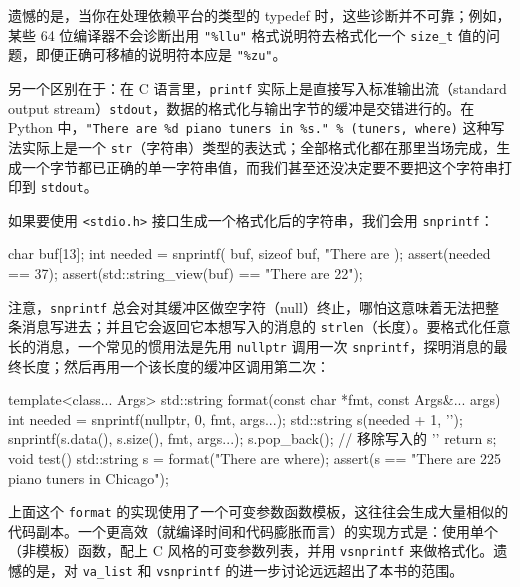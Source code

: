 遗憾的是，当你在处理依赖平台的类型的 typedef 时，这些诊断并不可靠；例如，某些 64 位编译器不会诊断出用 \texttt{"\%llu"} 格式说明符去格式化一个 \texttt{size\_\allowbreak{}t} 值的问题，即便正确可移植的说明符本应是 \texttt{"\%zu"}。

另一个区别在于：在 C 语言里，\texttt{printf} 实际上是直接写入标准输出流（standard output stream）\texttt{stdout}，数据的格式化与输出字节的缓冲是交错进行的。在 Python 中，\texttt{"There are \%d piano tuners in \%s." \% (\allowbreak{}tuners,\allowbreak{} where)\allowbreak{}} 这种写法实际上是一个 \texttt{str}（字符串）类型的表达式；全部格式化都在那里当场完成，生成一个字节都已正确的单一字符串值，而我们甚至还没决定要不要把这个字符串打印到 \texttt{stdout}。

如果要使用 \texttt{<stdio.\allowbreak{}h>\allowbreak{}} 接口生成一个格式化后的字符串，我们会用 \texttt{snprintf}：

\begin{codebox}[cpp]
    char buf[13];
    int needed = snprintf(
      buf, sizeof buf,
      "There are %
    );
    assert(needed == 37);
    assert(std::string_view(buf) == "There are 22");
\end{codebox}

注意，\texttt{snprintf} 总会对其缓冲区做空字符（null）终止，哪怕这意味着无法把整条消息写进去；并且它会返回它本想写入的消息的 \texttt{strlen}（长度）。要格式化任意长的消息，一个常见的惯用法是先用 \texttt{nullptr} 调用一次 \texttt{snprintf}，探明消息的最终长度；然后再用一个该长度的缓冲区调用第二次：

\begin{codebox}[cpp]
    template<class... Args>
    std::string format(const char *fmt, const Args&... args)
    {
      int needed = snprintf(nullptr, 0, fmt, args...);
      std::string s(needed + 1, '\0');
      snprintf(s.data(), s.size(), fmt, args...);
      s.pop_back(); // 移除写入的 '\0'
      return s;
    }
    void test()
    {
      std::string s = format("There are %
where);
      assert(s == "There are 225 piano tuners in Chicago");
    }
\end{codebox}

上面这个 \texttt{format} 的实现使用了一个可变参数函数模板，这往往会生成大量相似的代码副本。一个更高效（就编译时间和代码膨胀而言）的实现方式是：使用单个（非模板）函数，配上 C 风格的可变参数列表，并用 \texttt{vsnprintf} 来做格式化。遗憾的是，对 \texttt{va\_\allowbreak{}list} 和 \texttt{vsnprintf} 的进一步讨论远远超出了本书的范围。


